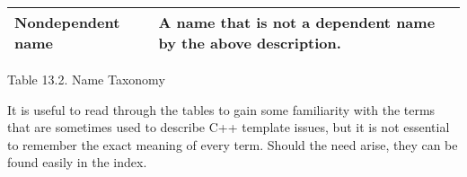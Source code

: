 \begin{table}[H]
\begin{tabular}{|l|l|}
		Nondependent name & A name that is not a dependent name by the above description.                                                                                                                                                                                                                                                                                                                                                                                                                                                                                                                                                                                                                                                                                                                                                                                                                        \\ \hline
	\end{tabular}
\end{table}

\begin{center}
Table 13.2. Name Taxonomy 
\end{center}

It is useful to read through the tables to gain some familiarity with the terms that are sometimes used to describe C++ template issues, but it is not essential to remember the exact meaning of every term. Should the need arise, they can be found easily in the index.

































